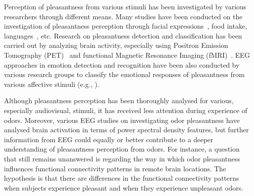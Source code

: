 Perception of pleasantness from various stimuli has been investigated by various researchers through different means. Many studies have been conducted on the investigation of pleasantness perception through facial expressions~\cite{lyons1998coding}, food intake\cite{de2003taste}, languages~\cite{bellezza1986words}, etc. Research on pleasantness detection and classification has been carried out by analyzing brain activity, especially using Positron Emission Tomography (PET)~\cite{zatorre2000neural} and functional Magnetic Resonance Imaging (fMRI)~\cite{kringelbach2003activation}. EEG approaches in emotion detection and recognition have been also conducted by various research groups to classify the emotional responses of pleasantness from various affective stimuli (e.g., ).

Although pleasantness perception has been thoroughly analysed for various, especially audiovisual, stimuli, it has received less attention during experience of odors. Moreover, various EEG studies on investigating odor pleasantness have analysed brain activation in terms of power spectral density features, but further information from EEG could equally or better contribute to a deeper understanding of pleasantness perception from odors. For instance, a question that still remains unanswered is regarding the way in which odor pleasantness influences functional connectivity patterns in remote brain locations. The hypothesis is that there are differences in the functional connectivity patterns when subjects experience pleasant and when they experience unpleasant odors. 


